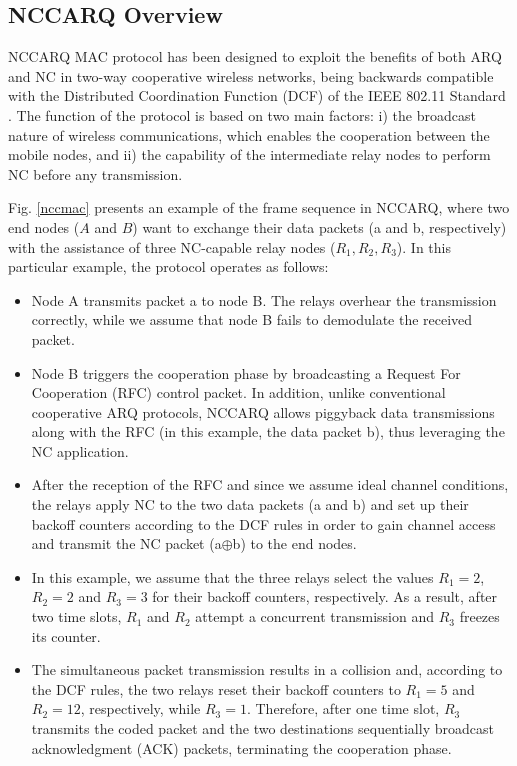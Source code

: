 \documentclass[12pt,draftcls, onecolumn]{IEEEtran}
\begin{document}
\subsection{NCCARQ Overview}
\label{sec:overview}

NCCARQ \cite{nccarq} MAC protocol has been designed to exploit the benefits of both ARQ and NC in two-way cooperative wireless networks, being backwards compatible with the Distributed Coordination Function (DCF) of the IEEE 802.11 Standard \cite{80211}. The function of the protocol is based on two main factors: i) the broadcast nature of wireless communications, which enables the cooperation between the mobile nodes, and ii) the capability of the intermediate relay nodes to perform NC before any transmission.

Fig. \ref{nccmac} presents an example of the frame sequence in NCCARQ, where two end nodes ($A$ and $B$) want to exchange their data packets (a and b, respectively) with the assistance of three NC-capable relay nodes ($R_1,R_2,R_3$). In this particular example, the protocol operates as follows:

\begin{itemize}
  \item Node A transmits packet a to node B. The relays overhear the transmission correctly, while we assume that node B fails to demodulate the received packet.
  \item Node B triggers the cooperation phase by broadcasting a Request For Cooperation (RFC) control packet. In addition, unlike conventional cooperative ARQ protocols, NCCARQ allows piggyback data transmissions along with the RFC (in this example, the data packet b), thus leveraging the NC application.
  \item After the reception of the RFC and since we assume ideal channel conditions, the relays apply NC to the two data packets (a and b) and set up their backoff counters according to the DCF rules in order to gain channel access and transmit the NC packet (a$\oplus$b) to the end nodes.
  \item In this example, we assume that the three relays select the values $R_1=2$, $R_2=2$ and $R_3=3$ for their backoff counters, respectively. As a result, after two time slots, $R_1$ and $R_2$ attempt a concurrent transmission and $R_3$ freezes its counter.
  \item The simultaneous packet transmission results in a collision and, according to the DCF rules, the two relays reset their backoff counters to $R_1=5$ and $R_2=12$, respectively, while $R_3=1$. Therefore, after one time slot, $R_3$ transmits the coded packet and the two destinations sequentially broadcast acknowledgment (ACK) packets, terminating the cooperation phase.
\end{itemize}
\end{document}
